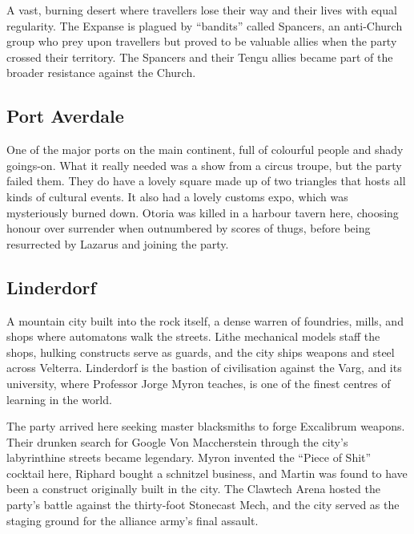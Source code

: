 A vast, burning desert where travellers lose their way and their lives with equal regularity.  The Expanse is plagued by ``bandits'' called Spancers, an anti-Church group who prey upon travellers but proved to be valuable allies when the party crossed their territory.  The Spancers and their Tengu allies became part of the broader resistance against the Church.

\smallskip

\subsection*{Port Averdale}

One of the major ports on the main continent, full of colourful people and shady goings-on.  What it really needed was a show from a circus troupe, but the party failed them.  They do have a lovely square made up of two triangles that hosts all kinds of cultural events.  It also had a lovely customs expo, which was mysteriously burned down.  Otoria was killed in a harbour tavern here, choosing honour over surrender when outnumbered by scores of thugs, before being resurrected by Lazarus and joining the party.

\smallskip

\subsection*{Linderdorf}

A mountain city built into the rock itself, a dense warren of foundries, mills, and shops where automatons walk the streets.  Lithe mechanical models staff the shops, hulking constructs serve as guards, and the city ships weapons and steel across Velterra.  Linderdorf is the bastion of civilisation against the Varg, and its university, where Professor Jorge Myron teaches, is one of the finest centres of learning in the world.

The party arrived here seeking master blacksmiths to forge Excalibrum weapons.  Their drunken search for Google Von Maccherstein through the city's labyrinthine streets became legendary.  Myron invented the ``Piece of Shit'' cocktail here, Riphard bought a schnitzel business, and Martin was found to have been a construct originally built in the city.  The Clawtech Arena hosted the party's battle against the thirty-foot Stonecast Mech, and the city served as the staging ground for the alliance army's final assault.

\smallskip

